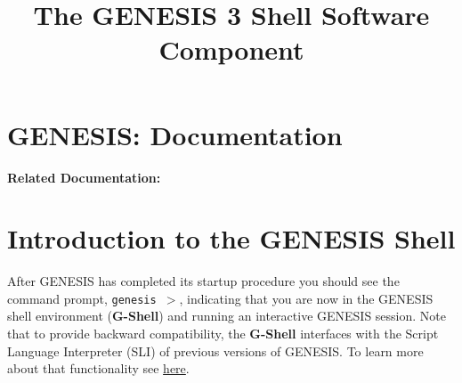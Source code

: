 \documentclass[12pt]{article}
\begin{document}

\title{\bf The GENESIS 3 Shell Software Component}

\maketitle

\section*{GENESIS: Documentation}

{\bf Related Documentation:}

\section*{Introduction to the GENESIS Shell}

After GENESIS has completed its startup procedure you should see the command prompt, {\tt genesis $>$}, indicating that you are now in the GENESIS shell environment ({\bf G-Shell}) and running an interactive GENESIS session. Note that to provide backward compatibility, the {\bf G-Shell} interfaces with the Script Language Interpreter (SLI) of previous versions of GENESIS. To learn more about that functionality see \href{../backward-compatibility/backward-compatibility.tex}{here}.



\end{document}
